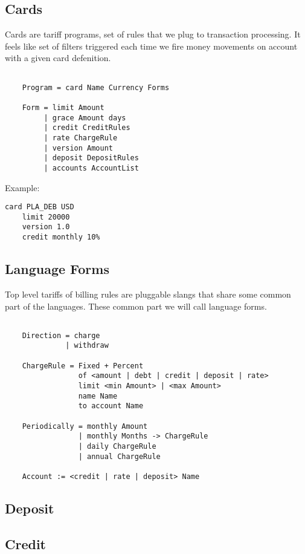 \newpage
\subsection{Cards}

Cards are tariff programs, set of rules that we plug to transaction processing.
It feels like set of filters triggered each time we fire money
movements on account with a given card defenition.

\vspace{1\baselineskip}
\begin{lstlisting}[caption=BNF]

    Program = card Name Currency Forms

    Form = limit Amount
         | grace Amount days
         | credit CreditRules
         | rate ChargeRule
         | version Amount
         | deposit DepositRules
         | accounts AccountList
\end{lstlisting}
\vspace{1\baselineskip}

Example:

\vspace{1\baselineskip}
\begin{lstlisting}[caption=credit.card]
    card PLA_DEB USD
    limit 20000
    version 1.0
    credit monthly 10%
\end{lstlisting}
\vspace{1\baselineskip}

\newpage
\subsection{Language Forms}

Top level tariffs of billing rules are pluggable slangs that
share some common part of the languages. These common part we will
call language forms.

\vspace{1\baselineskip}
\begin{lstlisting}[caption=BNF]

    Direction = charge 
              | withdraw

    ChargeRule = Fixed + Percent
                 of <amount | debt | credit | deposit | rate>
                 limit <min Amount> | <max Amount>
                 name Name
                 to account Name

    Periodically = monthly Amount 
                 | monthly Months -> ChargeRule
                 | daily ChargeRule
                 | annual ChargeRule

    Account := <credit | rate | deposit> Name

\end{lstlisting}
\vspace{1\baselineskip}

\subsection{Deposit}

\subsection{Credit}

